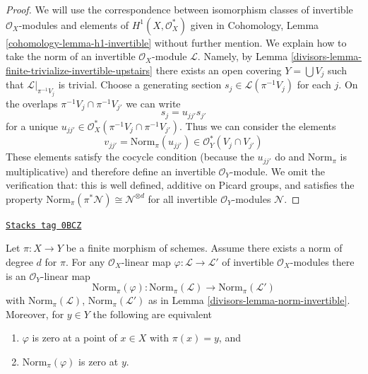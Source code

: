 \begin{proof}

We will use the correspondence between isomorphism classes of
invertible $\mathcal{O}_X$-modules and elements of
$H^1(X, \mathcal{O}_X^*)$ given in
Cohomology, Lemma \ref{cohomology-lemma-h1-invertible}
without further mention. We explain how to take the norm of an invertible
$\mathcal{O}_X$-module $\mathcal{L}$. Namely, by
Lemma \ref{divisors-lemma-finite-trivialize-invertible-upstairs}
there exists an open covering $Y = \bigcup V_j$ such that
$\mathcal{L}|_{\pi^{-1}V_j}$ is trivial. Choose a generating section
$s_j \in \mathcal{L}(\pi^{-1}V_j)$ for each $j$.
On the overlaps $\pi^{-1}V_j \cap \pi^{-1}V_{j'}$ we can write
$$
s_j = u_{jj'} s_{j'}
$$
for a unique $u_{jj'} \in \mathcal{O}^*_X(\pi^{-1}V_j \cap \pi^{-1}V_{j'})$.
Thus we can consider the elements
$$
v_{jj'} = \text{Norm}_\pi(u_{jj'}) \in \mathcal{O}_Y^*(V_j \cap V_{j'})
$$
These elements satisfy the cocycle condition (because the
$u_{jj'}$ do and $\text{Norm}_\pi$ is multiplicative) and
therefore define an invertible $\mathcal{O}_Y$-module.
We omit the verification that: this is well defined,
additive on Picard groups, and satisfies the property
$\text{Norm}_\pi(\pi^*\mathcal{N}) \cong \mathcal{N}^{\otimes d}$
for all invertible $\mathcal{O}_Y$-modules $\mathcal{N}$.
\end{proof}

\begin{lemma}
\label{divisors-lemma-norm-map-invertible}
\href{https://stacks.math.columbia.edu/tag/0BCZ}{\texttt{Stacks tag 0BCZ}}

Let $\pi : X \to Y$ be a finite morphism of schemes. Assume there exists
a norm of degree $d$ for $\pi$. For any $\mathcal{O}_X$-linear map
$\varphi : \mathcal{L} \to \mathcal{L}'$
of invertible $\mathcal{O}_X$-modules there is an $\mathcal{O}_Y$-linear
map
$$
\text{Norm}_\pi(\varphi) :
\text{Norm}_\pi(\mathcal{L})
\longrightarrow
\text{Norm}_\pi(\mathcal{L}')
$$
with $\text{Norm}_\pi(\mathcal{L})$, $\text{Norm}_\pi(\mathcal{L}')$
as in Lemma \ref{divisors-lemma-norm-invertible}. Moreover, for
$y \in Y$ the following are equivalent
\begin{enumerate}
\item $\varphi$ is zero at a point of $x \in X$ with $\pi(x) = y$, and
\item $\text{Norm}_\pi(\varphi)$ is zero at $y$.
\end{enumerate}
\end{lemma}

